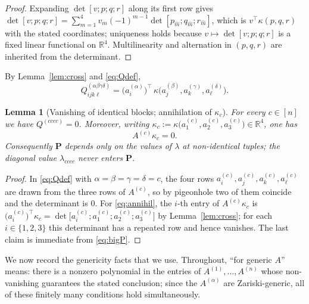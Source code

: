 \documentclass[12pt]{article}
\newcommand{\bR}{\mathbb{R}}
\newtheorem{lemma}{Lemma}
\theoremstyle{definition}
\begin{document}
\begin{proof}
Expanding $\det[v;p;q;r]$ along its first row gives
$\det[v;p;q;r]=\sum_{m=1}^4 v_m(-1)^{m-1}\det[p_{\widehat m};q_{\widehat m};r_{\widehat m}]$,
which is $v^\top\kappa(p,q,r)$ with the stated coordinates; uniqueness holds because
$v\mapsto\det[v;p;q;r]$ is a fixed linear functional on $\bR^4$.  Multilinearity and
alternation in $(p,q,r)$ are inherited from the determinant.
\end{proof}

By Lemma~\ref{lem:cross} and \eqref{eq:Qdef},
\begin{equation}\label{eq:Qcross}
Q^{(\alpha\beta\gamma\delta)}_{ijk\ell}
=\bigl(a^{(\alpha)}_i\bigr)^{\top}\,
\kappa\bigl(a^{(\beta)}_j,a^{(\gamma)}_k,a^{(\delta)}_\ell\bigr).
\end{equation}

\begin{lemma}[Vanishing of identical blocks; annihilation of $\kappa_c$]\label{lem:diag}
For every $c\in[n]$ we have $Q^{(cccc)}=0$.  Moreover, writing
$\kappa_c:=\kappa\bigl(a^{(c)}_1,a^{(c)}_2,a^{(c)}_3\bigr)\in\bR^4$, one has
\begin{equation}\label{eq:annihil}
A^{(c)}\kappa_c=0 .
\end{equation}
Consequently $\mathbf P$ depends only on the values of $\lambda$ at non-identical
tuples; the diagonal value $\lambda_{cccc}$ never enters $\mathbf P$.
\end{lemma}

\begin{proof}
In \eqref{eq:Qdef} with $\alpha=\beta=\gamma=\delta=c$, the four rows
$a^{(c)}_i,a^{(c)}_j,a^{(c)}_k,a^{(c)}_\ell$ are drawn from the three rows of
$A^{(c)}$, so by pigeonhole two of them coincide and the determinant is $0$.
For \eqref{eq:annihil}, the $i$-th entry of $A^{(c)}\kappa_c$ is
$\bigl(a^{(c)}_i\bigr)^\top\kappa_c=\det\bigl[a^{(c)}_i;a^{(c)}_1;a^{(c)}_2;a^{(c)}_3\bigr]$
by Lemma~\ref{lem:cross}; for each $i\in\{1,2,3\}$ this determinant has a repeated
row and hence vanishes.  The last claim is immediate from \eqref{eq:bigP}.
\end{proof}

\medskip
We now record the genericity facts that we use.  Throughout, ``for generic
$A$'' means: there is a nonzero polynomial in the entries of
$A^{(1)},\dots,A^{(n)}$ whose non-vanishing guarantees the stated conclusion;
since the $A^{(\alpha)}$ are Zariski-generic, all of these finitely many
conditions hold simultaneously.
\end{document}

